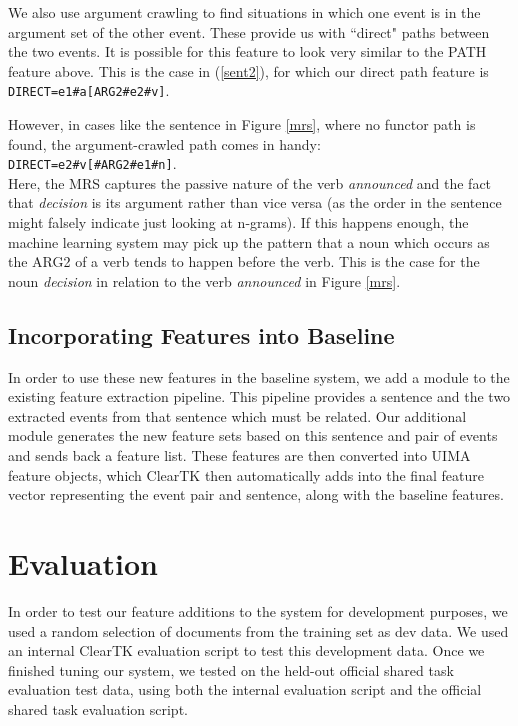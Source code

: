 \documentclass[11pt]{article}
\begin{document}
We also use argument crawling to find situations in which one event is in the argument set of the other event. These provide us with ``direct" paths between the two events. It is possible for this feature to look very similar to the PATH feature above. This is the case in (\ref{sent2}), for which our direct path feature is \texttt{DIRECT=e1\#a[ARG2\#e2\#v]}.

However, in cases like the sentence in Figure \ref{mrs}, where no functor path is found, the argument-crawled path comes in handy:\\

\texttt{DIRECT=e2\#v[\#ARG2\#e1\#n]}.\\

Here, the MRS captures the passive nature of the verb \emph{announced} and the fact that \emph{decision} is its argument rather than vice versa (as the order in the sentence might falsely indicate just looking at n-grams). If this happens enough, the machine learning system may pick up the pattern that a noun which occurs as the ARG2 of a verb tends to happen before the verb. This is the case for the noun \emph{decision} in relation to the verb \emph{announced} in Figure \ref{mrs}.

\subsection{Incorporating Features into Baseline}

In order to use these new features in the baseline system, we add a module to the existing feature extraction pipeline. This pipeline provides a sentence and the two extracted events from that sentence which must be related. Our additional module generates the new feature sets based on this sentence and pair of events and sends back a feature list. These features are then converted into UIMA feature objects, which ClearTK then automatically adds into the final feature vector representing the event pair and sentence, along with the baseline features.

\section{Evaluation}
\label{eval}

In order to test our feature additions to the system for development purposes, we used a random selection of documents from the training set as dev data. We used an internal ClearTK evaluation script to test this development data. Once we finished tuning our system, we tested on the held-out official shared task evaluation test data, using both the internal evaluation script and the official shared task evaluation script.
\end{document}
